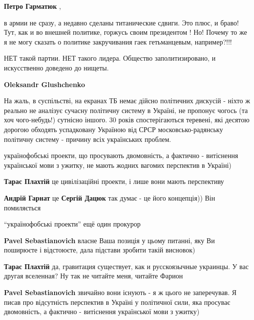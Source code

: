 \begin{itemize}
\begin{itemize}
\textbf{Петро Гарматюк} , 

в армии не сразу, а недавно сделаны титанические сдвиги. Это плюс, и браво!
Тут, как и во внешней политике, горжусь своим президентом ! Но! Почему то же я
не могу сказать о политике закручивания гаек гетьманцевым, например?!!!

\end{itemize} %


НЕТ такой партии. НЕТ такого лидера. Общество заполитизировано, и искусственно
доведено до нищеты.

\begin{itemize} %
\textbf{Oleksandr Glushchenko} 

На жаль, в суспільстві, на екранах ТБ немає дійсно політичних дискусій - ніхто
ж реально не аналізує сучасну політичну систему в Україні, не пропонує чогось
(та хоч чого-небудь!) сутнісно іншого. 30 років спостерігаються теревені, які
десятою дорогою обходять успадковану Україною від СРСР московсько-радянську
політичну систему - причину всіх українських проблем.

\end{itemize} %


українофобські проекти, що просувають двомовність, а фактично - витіснення
української мови з ужитку, не мають жодних вагомих перспектив в Україні)

\begin{itemize} %
\textbf{Тарас Плахтій}
це цивілізаційні проекти, і лише вони мають перспективу

\textbf{Андрій Гарнат} це \textbf{Сергій Дацюк} так думає - це його концепція)) Він помиляється

\enquote{українофобські проекти} ещё один прокурор

\textbf{Pavel Sebastianovich} власне Ваша позиція у цьому питанні, яку Ви поширюєте і відстоюєте, дала підстави зробити такій висновок)

\textbf{Тарас Плахтій} да, гравитация существует, как и русскоязычные украинцы. У вас другая вселенная? Ну так не читайте меня, читайте Фарион

\textbf{Pavel Sebastianovich} звичайно вони існують - я ж цього не заперечував. Я писав про відсутність перспектив в Україні у політичної сили, яка просуває двомовність, а фактично - витіснення української мови з ужитку)


\end{itemize}
\end{itemize}
